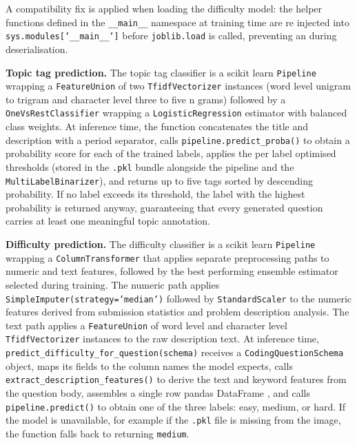 A compatibility fix is applied when loading the difficulty model: the
helper functions defined in the \texttt{\_\_main\_\_} namespace at
training time are re injected into \texttt{sys.modules['\_\_main\_\_']}
before \texttt{joblib.load} is called, preventing an
 during deserialisation.

\textbf{Topic tag prediction.} The topic tag classifier is a scikit
learn \texttt{Pipeline} \cite{pedregosa2011,buitinck2013api} wrapping a
\texttt{FeatureUnion} of two \texttt{TfidfVectorizer} instances (word
level unigram to trigram and character level three to five n grams)
followed by a \texttt{OneVsRestClassifier} wrapping a
\texttt{LogisticRegression} estimator with balanced class weights. At
inference time, the  function concatenates the title and description
with a period separator, calls \texttt{pipeline.predict\_proba()} to
obtain a probability score for each of the trained labels, applies the
per label optimised thresholds (stored in the \texttt{.pkl} bundle
alongside the pipeline and the \texttt{MultiLabelBinarizer}), and
returns up to five tags sorted by descending probability. If no label
exceeds its threshold, the label with the highest probability is
returned anyway, guaranteeing that every generated question carries at
least one meaningful topic annotation.

\textbf{Difficulty prediction.} The difficulty classifier is a scikit
learn \texttt{Pipeline} wrapping a \texttt{ColumnTransformer} that
applies separate preprocessing paths to numeric and text features,
followed by the best performing ensemble estimator selected during
training. The numeric path applies \texttt{SimpleImputer(strategy='median')}
followed by \texttt{StandardScaler} to the numeric features derived
from submission statistics and problem description analysis. The text
path applies a \texttt{FeatureUnion} of word level and character level
\texttt{TfidfVectorizer} instances to the raw description text. At
inference time, \texttt{predict\_difficulty\_for\_question(schema)}
receives a \texttt{CodingQuestionSchema} object, maps its fields to the
column names the model expects, calls
\texttt{extract\_description\_features()} to derive the text and keyword
features from the question body, assembles a single row pandas DataFrame
\cite{mckinney2010pandas}, and calls \texttt{pipeline.predict()} to
obtain one of the three labels: easy, medium, or hard. If the model is
unavailable, for example if the \texttt{.pkl} file is missing from the
image, the function falls back to returning \texttt{medium}.


